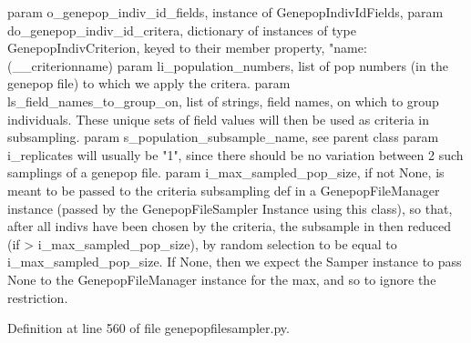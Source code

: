 \begin{DoxyVerb}param o_genepop_indiv_id_fields, instance of GenepopIndivIdFields,
param do_genepop_indiv_id_critera, dictionary of instances of 
type GenepopIndivCriterion, keyed to their member
property, "name: (__criterionname)
param li_population_numbers, list of pop numbers (in the genepop file)
to which we apply the critera.
param ls_field_names_to_group_on, list of strings, field names, 
on which to group individuals.  These unique sets of
field values will then be used as criteria in subsampling.
param s_population_subsample_name, see parent class
param i_replicates will usually be "1", since there should be
no variation between 2 such samplings of a genepop file.
param i_max_sampled_pop_size, if not None, is meant to be passed
    to the criteria subsampling def in a GenepopFileManager
    instance (passed by the GenepopFileSampler Instance using this
    class), so that, after all indivs have been chosen by the 
    criteria, the subsample in then reduced (if > i_max_sampled_pop_size),
    by random selection to be equal to i_max_sampled_pop_size.
    If None, then we expect the Samper instance to pass None to 
    the GenepopFileManager instance for the max, and so to ignore
    the restriction.
\end{DoxyVerb}
 

Definition at line 560 of file genepopfilesampler.\+py.



